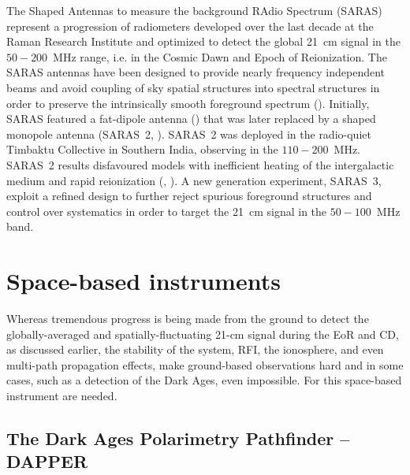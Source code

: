 The Shaped Antennas to measure the background RAdio Spectrum (SARAS) represent a progression of radiometers developed over the last decade at the Raman Research Institute and optimized to detect the global 21~cm signal in the $50-200$~MHz range, i.e. in the Cosmic Dawn and Epoch of Reionization.
%
The SARAS antennas have been designed to provide nearly frequency independent beams and avoid coupling of sky spatial structures into spectral structures in order to preserve the intrinsically smooth foreground spectrum (\cite{sathyanarayana17}).
%
Initially, SARAS featured a fat-dipole antenna (\cite{patra13}) that was later replaced by a shaped monopole antenna (SARAS~2, \cite{singh18a}). SARAS~2 was deployed in the radio-quiet Timbaktu Collective in Southern India, observing in the $110-200$~MHz. SARAS~2 results disfavoured models with inefficient heating of the intergalactic medium and rapid reionization (\cite{singh17}, \cite{singh18b}). 
A new generation experiment, SARAS~3, exploit a refined design to further reject spurious foreground structures and control over systematics in order to target the 21~cm signal in the $50-100$~MHz band.





\section{Space-based instruments}
\label{sec:space_base_instruments}

Whereas tremendous progress is being made from the ground to detect the globally-averaged and spatially-fluctuating 21-cm signal during the EoR and CD, as discussed earlier, the stability of the system, RFI, the ionosphere, and even multi-path propagation effects, make ground-based observations hard and in some cases, such as a detection of the Dark Ages, even impossible. For this space-based instrument are needed. 

\subsection{The Dark Ages Polarimetry Pathfinder -- DAPPER}

